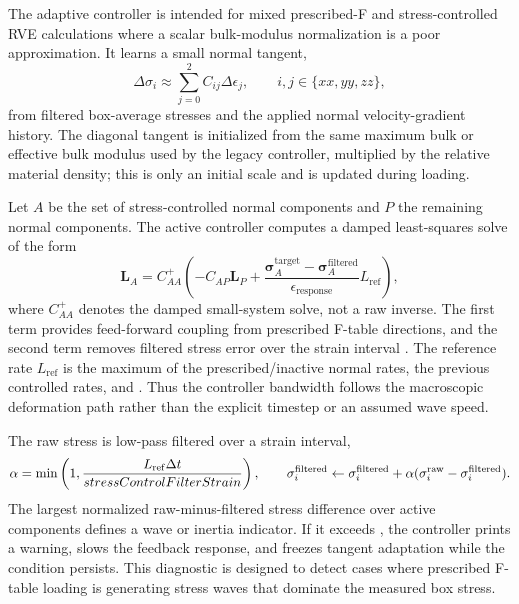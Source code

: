 The adaptive controller is intended for mixed prescribed-F and stress-controlled
RVE calculations where a scalar bulk-modulus normalization is a poor
approximation.  It learns a small normal tangent,
\begin{equation}
  \Delta\sigma_i \approx \sum_{j=0}^{2} C_{ij}\Delta\epsilon_j,
  \qquad i,j\in\{xx,yy,zz\},
  \label{eq:bc-adaptive-seek-tangent}
\end{equation}
from filtered box-average stresses and the applied normal velocity-gradient
history.  The diagonal tangent is initialized from the same maximum bulk or
effective bulk modulus used by the legacy controller, multiplied by the relative
material density; this is only an initial scale and is updated during loading.

Let $A$ be the set of stress-controlled normal components and $P$ the remaining
normal components.  The active controller computes a damped least-squares solve
of the form
\begin{equation}
  \mathbf{L}_A = C_{AA}^{+}\left(
    -C_{AP}\mathbf{L}_P
    + \frac{\boldsymbol{\sigma}^{\mathrm{target}}_A-
             \boldsymbol{\sigma}^{\mathrm{filtered}}_A}
           {\epsilon_{\mathrm{response}}}
      L_{\mathrm{ref}}
  \right),
  \label{eq:bc-adaptive-seek-active-law}
\end{equation}
where $C_{AA}^{+}$ denotes the damped small-system solve, not a raw inverse.
The first term provides feed-forward coupling from prescribed F-table
directions, and the second term removes filtered stress error over the strain
interval .  The reference rate
$L_{\mathrm{ref}}$ is the maximum of the prescribed/inactive normal rates, the
previous controlled rates, and .  Thus the
controller bandwidth follows the macroscopic deformation path rather than the
explicit timestep or an assumed wave speed.

The raw stress is low-pass filtered over a strain interval,
\begin{equation}
  \alpha = \min\left(1,
    \frac{L_{\mathrm{ref}}\Delta t}{stressControlFilterStrain}
  \right),
  \qquad
  \sigma_i^{\mathrm{filtered}} \leftarrow
  \sigma_i^{\mathrm{filtered}} +
  \alpha(\sigma_i^{\mathrm{raw}}-\sigma_i^{\mathrm{filtered}}).
  \label{eq:bc-adaptive-seek-filter}
\end{equation}
The largest normalized raw-minus-filtered stress difference over active
components defines a wave or inertia indicator.  If it exceeds
, the controller prints a warning, slows the
feedback response, and freezes tangent adaptation while the condition persists.
This diagnostic is designed to detect cases where prescribed F-table loading is
generating stress waves that dominate the measured box stress.

